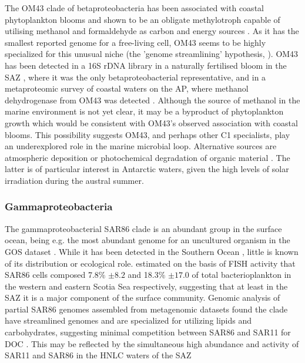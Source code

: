 The OM43 clade of betaproteobacteria has been associated with coastal phytoplankton blooms \cite{Morris:2006hma} and shown to be an obligate methylotroph capable of utilising methanol and formaldehyde as carbon and energy sources \cite{Giovannoni:2008kw}.
As it has the smallest reported genome for a free-living cell, OM43 seems to be highly specialized for this unusual niche (the 'genome streamlining' hypothesis, \citet{Mira:2001ti}).
OM43 has been detected in a 16S rDNA library in a naturally fertilised bloom in the \ac{SAZ} \cite{West:2008kc}, where it was the only betaproteobacterial representative, and in a metaproteomic survey of coastal waters on the \ac{AP}, where methanol dehydrogenase from OM43 was detected \cite{Williams:2012bs}.
Although the source of methanol in the marine environment is not yet clear, it may be a byproduct of phytoplankton growth \cite{Heikes:2002ee} which would be consistent with OM43's observed association with coastal blooms.
This possibility suggests OM43, and perhaps other C1 specialists, play an underexplored role in the marine microbial loop.
Alternative sources are atmospheric deposition \cite{Sinha:2007uu} or photochemical degradation of organic material \cite{Dixon:2011er}.
The latter is of particular interest in Antarctic waters, given the high levels of solar irradiation during the austral summer.

\subsubsection{Gammaproteobacteria}


The gammaproteobacterial SAR86 clade is an abundant group in the surface ocean, being e.g. the most abundant genome for an uncultured organism in the \ac{GOS} dataset \cite{Dupont:2011fk}.
While it has been detected in the Southern Ocean \cite{Abell:2005ji,Topping:2006ul,West:2008kc,Obernosterer:2011df}, little is known of its distribution or ecological role.
\cite{Topping:2006ul} estimated on the basis of \ac{FISH} activity that SAR86 cells composed 7.8\% $\pm8.2$ and 18.3\% $\pm17.0$ of total bacterioplankton in the western and eastern Scotia Sea respectively, suggesting that at least in the SAZ it is a major component of the surface community.
Genomic analysis of partial SAR86 genomes assembled from metagenomic datasets found the clade have streamlined genomes and are specialized for utilizing lipids and carbohydrates, suggesting minimal competition between SAR86 and SAR11 for \ac{DOC} \cite{Dupont:2011fk}.
This may be reflected by the simultaneous high abundance and activity of SAR11 and SAR86 in the \ac{HNLC} waters of the \ac{SAZ} \cite{Obernosterer:2011df}

